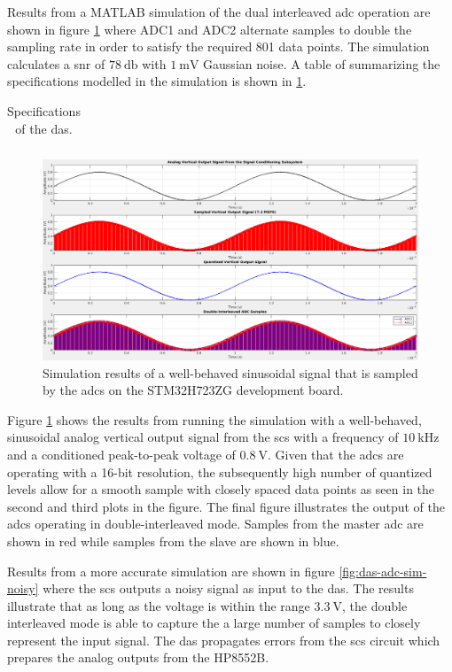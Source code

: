 \documentclass[class=report,11pt,crop=false]{standalone}
\begin{document}
	Results from a MATLAB simulation of the dual interleaved \acrshort{adc} operation are shown in figure \ref{fig:das-matlab-sim} where ADC1 and ADC2 alternate samples to double the sampling rate in order to satisfy the required 801 data points. The simulation calculates a \acrshort{snr} of $\SI{78}{\decibel}$ with $\SI{1}{\milli\volt}$ Gaussian noise. A table of summarizing the specifications modelled in the simulation is shown in \ref{tab:das-matlab-sim-specs}.
	
	\begin{table}[ht!]
		\centering
		\label{tab:das-matlab-sim-specs}
		\caption{Specifications of the \acrshort{das}.}
		\begin{tabular}{ccc}
			
		\end{tabular}
	\end{table}
	
	\begin{figure}[h!]
		\centering
		\includegraphics[width=0.70\linewidth]{Figures/Methodology/das-adc-sim}
		\caption{Simulation results of a well-behaved sinusoidal signal that is sampled by the \acrshort{adc}s on the STM32H723ZG development board.}
		\label{fig:das-matlab-sim}
	\end{figure} 
	
	Figure \ref{fig:das-matlab-sim} shows the results from running the simulation with a well-behaved, sinusoidal analog vertical output signal from the \acrshort{scs} with a frequency of $\SI{10}{\kilo\hertz}$ and a conditioned peak-to-peak voltage of $\SI{0.8}{\volt}$. Given that the \acrshort{adc}s are operating with a 16-bit resolution, the subsequently high number of quantized levels allow for a smooth sample with closely spaced data points as seen in the second and third plots in the figure. The final figure illustrates the output of the \acrshort{adc}s operating in double-interleaved mode. Samples from the master \acrshort{adc} are shown in red while samples from the slave are shown in blue. 
	
	Results from a more accurate simulation are shown in figure \ref{fig:das-adc-sim-noisy} where the \acrshort{scs} outputs a noisy signal as input to the \acrshort{das}. The results illustrate that as long as the voltage is within the range $\SI{3.3}{\volt}$, the double interleaved mode is able to capture the a large number of samples to closely represent the input signal. The \acrshort{das} propagates errors from the \acrshort{scs} circuit which prepares the analog outputs from the HP8552B. 
	
\end{document}
